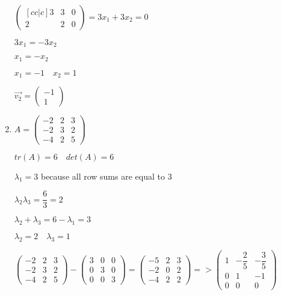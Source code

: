 \documentclass[12pt,letterpaper]{article}
\begin{document}
\begin{enumerate}[label=(\alph*)]
        $\begin{pmatrix}[cc|c]
          3 & 3 & 0\\
          2 & 2 & 0
        \end{pmatrix} = 3x_1 + 3x_2 = 0$
        
        $3x_1 = -3x_2$
        
        $x_1 = -x_2$
        
        $x_1 = -1\quad x_2 = 1$
        
        $\vec{v_2} = \begin{pmatrix} -1 \\ 1 \end{pmatrix}$
        \item
        
        $A = \begin{pmatrix}
            -2 & 2 & 3 \\
            -2 & 3 & 2 \\
            -4 & 2 & 5
        \end{pmatrix}$
        
        $tr(A) = 6 \quad det(A) = 6$
        
        $\lambda_1 = 3$ because all row sums are equal to $3$
        
        $\lambda_2\lambda_3 = \dfrac{6}{3} = 2$
        
        $\lambda_2 + \lambda_3 = 6 - \lambda_1 = 3$
        
        $\lambda_2 = 2\quad\lambda_3 = 1$
        
        $\begin{pmatrix}
            -2 & 2 & 3 \\
            -2 & 3 & 2 \\
            -4 & 2 & 5
        \end{pmatrix} - \begin{pmatrix}
            3 & 0 & 0 \\
            0 & 3 & 0 \\
            0 & 0 & 3
        \end{pmatrix} = \begin{pmatrix}
            -5 & 2 & 3 \\
            -2 & 0 & 2 \\
            -4 & 2 & 2
        \end{pmatrix} => \begin{pmatrix}
            1 & -\dfrac{2}{5} & -\dfrac{3}{5} \\
            0 & 1 & -1 \\
            0 & 0 & 0
        \end{pmatrix}$
        

\end{enumerate}
\end{document}
